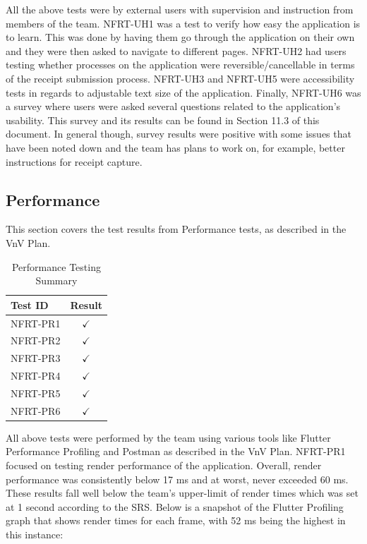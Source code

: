 \documentclass[12pt, titlepage]{article}
\begin{document}
All the above tests were by external users with supervision and instruction from members of the team. NFRT-UH1 was a test
to verify how easy the application is to learn. This was done by having them go through the application on their own
and they were then asked to navigate to different pages. NFRT-UH2 had users testing whether processes on the
application were reversible/cancellable in terms of the receipt submission process. NFRT-UH3 and NFRT-UH5 were
accessibility tests in regards to adjustable text size of the application. Finally, NFRT-UH6 was a survey where users
were asked several questions related to the application's usability. This survey and its results can be found
in Section 11.3 of this document. In general though, survey results were positive with some issues that have been noted down and
the team has plans to work on, for example, better instructions for receipt capture.

\subsection{Performance}

This section covers the test results from Performance tests, as described in the VnV Plan.

\begin{longtable}{|l|c|}
  \caption{Performance Testing Summary} \label{Performance Testing Summary} \\
  \toprule
  \textbf{Test ID} & \textbf{Result} \\
  \midrule
  NFRT-PR1 & $\checkmark$ \\
  \midrule
  NFRT-PR2 & $\checkmark$ \\
  \midrule
  NFRT-PR3 & $\checkmark$ \\
  \midrule
  NFRT-PR4 & $\checkmark$ \\
  \midrule
  NFRT-PR5 & $\checkmark$ \\
  \midrule
  NFRT-PR6 & $\checkmark$ \\
  \bottomrule
\end{longtable}

All above tests were performed by the team using various tools like Flutter Performance Profiling and Postman
as described in the VnV Plan. NFRT-PR1 focused on testing render performance of the application. Overall, render
performance was consistently below 17 ms and at worst, never exceeded 60 ms. These results fall well below the team's
upper-limit of render times which was set at 1 second according to the SRS. Below is a snapshot of the Flutter Profiling graph that
shows render times for each frame, with 52 ms being the highest in this instance:
\end{document}
